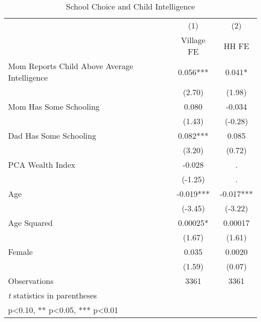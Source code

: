 \begin{table}[htbp]\centering
\def\sym#1{\ifmmode^{#1}\else\(^{#1}\)\fi}
\caption{School Choice and Child Intelligence\label{hhselection}}
\begin{tabular}{l*{2}{c}}
\hline\hline
                &\multicolumn{1}{c}{(1)}&\multicolumn{1}{c}{(2)}\\
                &\multicolumn{1}{c}{Village FE}&\multicolumn{1}{c}{HH FE}\\
\hline
Mom Reports Child Above Average Intelligence&    0.056***&    0.041*  \\
                &   (2.70)   &   (1.98)   \\
Mom Has Some Schooling&    0.080   &   -0.034   \\
                &   (1.43)   &  (-0.28)   \\
Dad Has Some Schooling&    0.082***&    0.085   \\
                &   (3.20)   &   (0.72)   \\
PCA Wealth Index&   -0.028   &        .   \\
                &  (-1.25)   &        .   \\
Age             &   -0.019***&   -0.017***\\
                &  (-3.45)   &  (-3.22)   \\
Age Squared     &  0.00025*  &  0.00017   \\
                &   (1.67)   &   (1.61)   \\
Female          &    0.035   &   0.0020   \\
                &   (1.59)   &   (0.07)   \\
\hline
Observations    &     3361   &     3361   \\
\hline\hline
\multicolumn{3}{l}{\footnotesize \textit{t} statistics in parentheses}\\
\multicolumn{3}{l}{\footnotesize * p<0.10, ** p<0.05, *** p<0.01}\\
\end{tabular}
\end{table}
